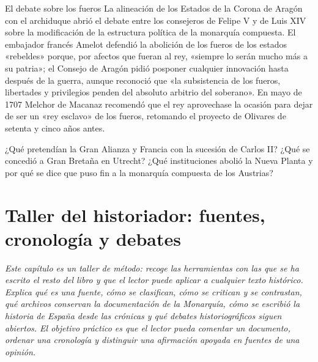 \documentclass{book}
\begin{document}
\begin{tcolorbox}[title={Autoficha}, studiumcheck, breakable]

El debate sobre los fueros
La alineación de los Estados de la Corona de Aragón con el archiduque abrió el debate entre los consejeros de Felipe V y de Luis XIV sobre la modificación de la estructura política de la monarquía compuesta. El embajador francés Amelot defendió la abolición de los fueros de los estados «rebeldes» porque, por afectos que fueran al rey, «siempre lo serán mucho más a su patria»; el Consejo de Aragón pidió posponer cualquier innovación hasta después de la guerra, aunque reconoció que «la subsistencia de los fueros, libertades y privilegios penden del absoluto arbitrio del soberano». En mayo de 1707 Melchor de Macanaz recomendó que el rey aprovechase la ocasión para dejar de ser un «rey esclavo» de los fueros, retomando el proyecto de Olivares de setenta y cinco años antes.


¿Qué pretendían la Gran Alianza y Francia con la sucesión de Carlos II? ¿Qué se concedió a Gran Bretaña en Utrecht? ¿Qué instituciones abolió la Nueva Planta y por qué se dice que puso fin a la monarquía compuesta de los Austrias?

\end{tcolorbox}

\chapter{Taller del historiador: fuentes, cronología y debates}
\label{chap:hist-12}

\noindent\textit{Este capítulo es un taller de método: recoge las herramientas con las que se ha escrito el resto del libro y que el lector puede aplicar a cualquier texto histórico. Explica qué es una fuente, cómo se clasifican, cómo se critican y se contrastan, qué archivos conservan la documentación de la Monarquía, cómo se escribió la historia de España desde las crónicas y qué debates historiográficos siguen abiertos. El objetivo práctico es que el lector pueda comentar un documento, ordenar una cronología y distinguir una afirmación apoyada en fuentes de una opinión.}
\end{document}
